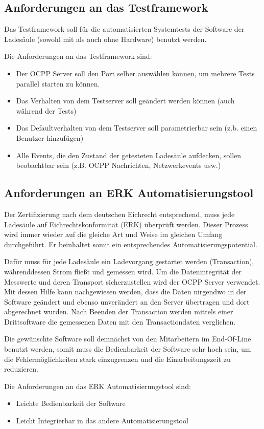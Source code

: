 \newpage
\subsection{Anforderungen an das Testframework }
    Das Testframework soll für die automatisierten Systemtests der Software der Ladesäule (sowohl mit als auch ohne Hardware) benutzt werden.

    Die Anforderungen an das Testframework sind:
    \begin{itemize}
        \item Der OCPP Server soll den Port selber auswählen können, um mehrere Tests parallel starten zu können.
        \item Das Verhalten von dem Testserver soll geändert werden können (auch während der Tests)
        \item Das Defaultverhalten von dem Testserver soll parametrierbar sein (z.b. einen Benutzer hinzufügen)
        \item Alle Events, die den Zustand der getesteten Ladesäule aufdecken, sollen beobachtbar sein (z.B. OCPP Nachrichten, Netzwerkevents usw.)
    \end{itemize}

\subsection{Anforderungen an ERK Automatisierungstool}
    Der Zertifizierung nach dem deutschen Eichrecht entsprechend, muss jede Ladesäule auf Eichrechtskonformität (ERK) überprüft werden.
    Dieser Prozess wird immer wieder auf die gleiche Art und Weise im gleichen Umfang durchgeführt. 
    Er beinhaltet somit ein entsprechendes Automatisierungspotential.
  
    Dafür muss für jede Ladesäule ein Ladevorgang gestartet werden (Transaction), währenddessen Strom fließt und gemessen wird.   
    Um die Datenintegrität der Messwerte und deren Transport sicherzustellen wird der OCPP Server verwendet. 
    Mit dessen Hilfe kann nachgewiesen werden, 
    dass die Daten nirgendwo in der Software geändert und ebenso unverändert an den Server übertragen und dort abgerechnet wurden. 
    Nach Beenden der Transaction werden mittels einer Drittsoftware die gemessenen Daten mit den Transactiondaten verglichen.

    Die gewünschte Software soll demnächst von den Mitarbeitern im End-Of-Line benutzt werden, somit muss die Bedienbarkeit der Software sehr hoch sein,
    um die Fehlermöglichkeiten stark einzugrenzen und die Einarbeitungszeit zu reduzieren.

    Die Anforderungen an das ERK Automatisierungstool sind:
    \begin{itemize}
        \item Leichte Bedienbarkeit der Software
        \item Leicht Integrierbar in das andere Automatisierungstool
    \end{itemize}



